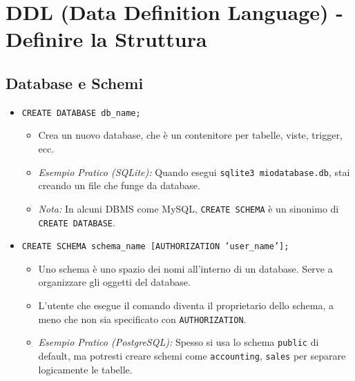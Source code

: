 \section{DDL (Data Definition Language) - Definire la Struttura}

\subsection{Database e Schemi}
\begin{itemize}
	\item \texttt{CREATE DATABASE db\_name;}
	\begin{itemize}
		\item Crea un nuovo database, che è un contenitore per tabelle, viste, trigger, ecc.
		\item \textit{Esempio Pratico (SQLite):} Quando esegui \texttt{sqlite3 miodatabase.db}, stai creando un file che funge da database.
		\item \textit{Nota:} In alcuni DBMS come MySQL, \texttt{CREATE SCHEMA} è un sinonimo di \texttt{CREATE DATABASE}.
	\end{itemize}
	\item \texttt{CREATE SCHEMA schema\_name [AUTHORIZATION 'user\_name'];}
	\begin{itemize}
		\item Uno schema è uno spazio dei nomi all'interno di un database. Serve a organizzare gli oggetti del database.
		\item L'utente che esegue il comando diventa il proprietario dello schema, a meno che non sia specificato con \texttt{AUTHORIZATION}.
		\item \textit{Esempio Pratico (PostgreSQL):} Spesso si usa lo schema \texttt{public} di default, ma potresti creare schemi come \texttt{accounting}, \texttt{sales} per separare logicamente le tabelle.
	\end{itemize}
\end{itemize}


